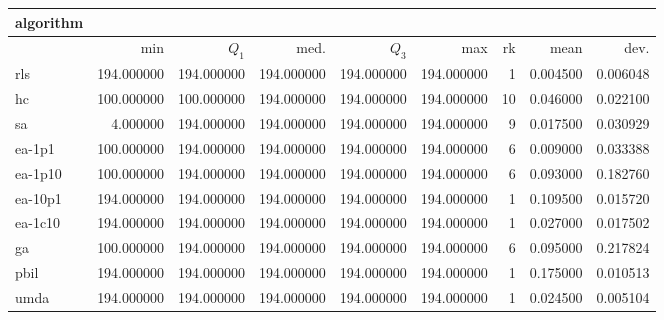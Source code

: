 \begin{center}
\begin{tabular}{@{}l*{5}{>{{}}N{3}{0}}>{{}}N{2}{0}N{1}{3}N{1}{3}@{}}
\toprule
{algorithm} &  &  \\
\midrule
& {min} & {$Q_1$} & {med.} & {$Q_3$} & {max} & {rk} & {mean} & {dev.} \\
\midrule
rls & {\color{blue}} 194.000000 & {\color{blue}} 194.000000 & {\color{blue}} 194.000000 & {\color{blue}} 194.000000 & {\color{blue}} 194.000000 & 1 & 0.004500 & 0.006048 \\
 hc & 100.000000 & 100.000000 & {\color{blue}} 194.000000 & {\color{blue}} 194.000000 & {\color{blue}} 194.000000 & 10 & 0.046000 & 0.022100 \\
 sa & 4.000000 & {\color{blue}} 194.000000 & {\color{blue}} 194.000000 & {\color{blue}} 194.000000 & {\color{blue}} 194.000000 & 9 & 0.017500 & 0.030929 \\
 ea-1p1 & 100.000000 & {\color{blue}} 194.000000 & {\color{blue}} 194.000000 & {\color{blue}} 194.000000 & {\color{blue}} 194.000000 & 6 & 0.009000 & 0.033388 \\
 ea-1p10 & 100.000000 & {\color{blue}} 194.000000 & {\color{blue}} 194.000000 & {\color{blue}} 194.000000 & {\color{blue}} 194.000000 & 6 & 0.093000 & 0.182760 \\
 ea-10p1 & {\color{blue}} 194.000000 & {\color{blue}} 194.000000 & {\color{blue}} 194.000000 & {\color{blue}} 194.000000 & {\color{blue}} 194.000000 & 1 & 0.109500 & 0.015720 \\
 ea-1c10 & {\color{blue}} 194.000000 & {\color{blue}} 194.000000 & {\color{blue}} 194.000000 & {\color{blue}} 194.000000 & {\color{blue}} 194.000000 & 1 & 0.027000 & 0.017502 \\
 ga & 100.000000 & {\color{blue}} 194.000000 & {\color{blue}} 194.000000 & {\color{blue}} 194.000000 & {\color{blue}} 194.000000 & 6 & 0.095000 & 0.217824 \\
 pbil & {\color{blue}} 194.000000 & {\color{blue}} 194.000000 & {\color{blue}} 194.000000 & {\color{blue}} 194.000000 & {\color{blue}} 194.000000 & 1 & 0.175000 & 0.010513 \\
 umda & {\color{blue}} 194.000000 & {\color{blue}} 194.000000 & {\color{blue}} 194.000000 & {\color{blue}} 194.000000 & {\color{blue}} 194.000000 & 1 & 0.024500 & 0.005104 \\
 \bottomrule
\end{tabular}
\end{center}

